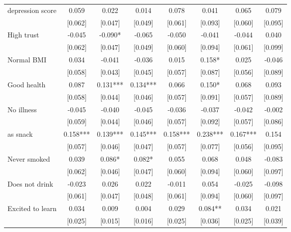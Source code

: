 \documentclass[12pt]{article}
\begin{document}
\begin{table}[ht]
\begin{center}
\begin{adjustbox}{width=1.2\textwidth,center=\textwidth}
\begin{tabular}{lccccccc}
{depression score } & {0.059 } & {0.022 } & {0.014 } & {0.078 } & {0.041 } & {0.065 } & {0.079 }\\
 & [0.062] & [0.047] & [0.049] & [0.061] & [0.093] & [0.060] & [0.095]\\
{High trust } & {-0.045 } & {-0.090{*} } & {-0.065 } & {-0.050 } & {-0.041 } & {-0.044 } & {0.040 }\\
 & [0.062] & [0.047] & [0.049] & [0.060] & [0.094] & [0.061] & [0.099]\\
{Normal BMI } & {0.034 } & {-0.041 } & {-0.036 } & {0.015 } & {0.158{*} } & {0.025 } & {-0.046 }\\
 & [0.058] & [0.043] & [0.045] & [0.057] & [0.087] & [0.056] & [0.089]\\
{Good health } & {0.087 } & {0.131{*}{*}{*} } & {0.134{*}{*}{*} } & {0.066 } & {0.150{*} } & {0.068 } & {0.093 }\\
 & [0.058] & [0.044] & [0.046] & [0.057] & [0.091] & [0.057] & [0.089]\\
{No illness } & {-0.045 } & {-0.040 } & {-0.045 } & {-0.036 } & {-0.037 } & {-0.042 } & {-0.002 }\\
 & [0.059] & [0.044] & [0.046] & [0.057] & [0.092] & [0.057] & [0.086]\\
{%
as snack } & {0.158{*}{*}{*} } & {0.139{*}{*}{*} } & {0.145{*}{*}{*} } & {0.158{*}{*}{*} } & {0.238{*}{*}{*} } & {0.167{*}{*}{*} } & {0.154 }\\
 & [0.057] & [0.046] & [0.047] & [0.057] & [0.077] & [0.056] & [0.095]\\
{Never smoked } & {0.039 } & {0.086{*} } & {0.082{*} } & {0.055 } & {0.068 } & {0.048 } & {-0.083 }\\
 & [0.062] & [0.046] & [0.047] & [0.060] & [0.094] & [0.060] & [0.097]\\
{Does not drink } & {-0.023 } & {0.026 } & {0.022 } & {-0.011 } & {0.054 } & {-0.025 } & {-0.098 }\\
 & [0.061] & [0.047] & [0.048] & [0.061] & [0.094] & [0.060] & [0.097]\\
{Excited to learn } & {0.034 } & {0.009 } & {0.004 } & {0.029 } & {0.084{*}{*} } & {0.034 } & {0.021 }\\
 & [0.025] & [0.015] & [0.016] & [0.025] & [0.036] & [0.025] & [0.039]\\

\end{tabular}
\end{adjustbox}
\end{center}
\end{table}
\end{document}
